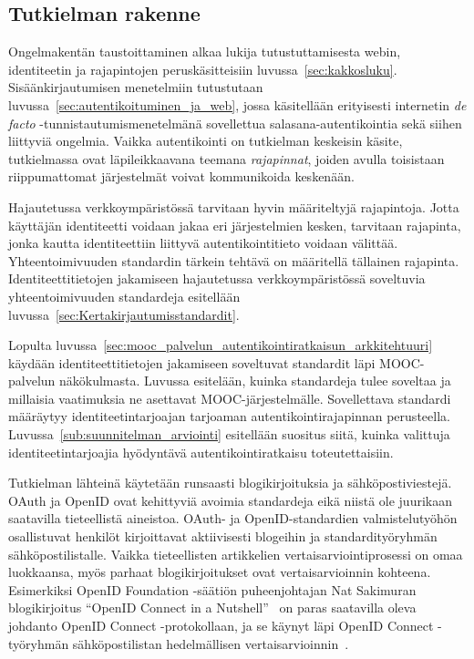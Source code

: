\documentclass[finnish,gradu]{tktltiki}
\begin{document}


\subsection{Tutkielman rakenne} %
\label{sub:tutkielman_rakenne}

  Ongelmakentän taustoittaminen alkaa lukija tutustuttamisesta webin, identiteetin ja rajapintojen peruskäsitteisiin luvussa~\ref{sec:kakkosluku}. Sisäänkirjautumisen menetelmiin tutustutaan luvussa~\ref{sec:autentikoituminen_ja_web}, jossa käsitellään erityisesti internetin \emph{de facto} -tunnistautumismenetelmänä sovellettua salasana-autentikointia sekä siihen liittyviä ongelmia. Vaikka autentikointi on tutkielman keskeisin käsite, tutkielmassa ovat läpileikkaavana teemana \emph{rajapinnat}, joiden avulla toisistaan riippumattomat järjestelmät voivat kommunikoida keskenään.

  Hajautetussa verkkoympäristössä tarvitaan hyvin määriteltyjä rajapintoja. Jotta käyttäjän identiteetti voidaan jakaa eri järjestelmien kesken, tarvitaan rajapinta, jonka kautta identiteettiin liittyvä autentikointitieto voidaan välittää. Yhteentoimivuuden standardin tärkein tehtävä on määritellä tällainen rajapinta. Identiteettitietojen jakamiseen hajautetussa verkkoympäristössä soveltuvia yhteentoimivuuden standardeja esitellään luvussa~\ref{sec:Kertakirjautumisstandardit}.

  Lopulta luvussa~\ref{sec:mooc_palvelun_autentikointiratkaisun_arkkitehtuuri} käydään identiteettitietojen jakamiseen soveltuvat standardit läpi MOOC-palvelun näkökulmasta. Luvussa esitelään, kuinka standardeja tulee soveltaa ja millaisia vaatimuksia ne asettavat MOOC-järjestelmälle. Sovellettava standardi määräytyy identiteetintarjoajan tarjoaman autentikointirajapinnan perusteella. Luvussa~\ref{sub:suunnitelman_arviointi} esitellään suositus siitä, kuinka valittuja identiteetintarjoajia hyödyntävä autentikointiratkaisu toteutettaisiin.

  Tutkielman lähteinä käytetään runsaasti blogikirjoituksia ja sähköpostiviestejä. OAuth ja OpenID ovat kehittyviä avoimia standardeja eikä niistä ole juurikaan saatavilla tieteellistä aineistoa. OAuth- ja OpenID-standardien valmistelutyöhön osallistuvat henkilöt kirjoittavat aktiivisesti blogeihin ja standardityöryhmän sähköpostilistalle. Vaikka tieteellisten artikkelien vertaisarviointiprosessi on omaa luokkaansa, myös parhaat blogikirjoitukset ovat vertaisarvioinnin kohteena. Esimerkiksi OpenID Foundation -säätiön puheenjohtajan Nat Sakimuran blogikirjoitus ``OpenID Connect in a Nutshell''~\cite{sakimura_openid_c_nutshell_2012} on paras saatavilla oleva johdanto OpenID Connect -protokollaan, ja se käynyt läpi OpenID Connect -työryhmän sähköpostilistan hedelmällisen vertaisarvioinnin~\cite{openid_c_nutshell_peer_review_1_2012, openid_c_nutshell_peer_review_2_2012}.
\end{document}
